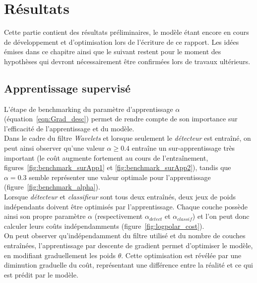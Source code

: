 
\chapter{Résultats} %
 
\label{Résultats} %


Cette partie contient des résultats préliminaires, le modèle étant encore en cours de développement et d'optimisation lors de l'écriture de ce rapport. Les idées émises dans ce chapitre ainsi que le suivant restent pour le moment des hypothèses qui devront nécessairement être confirmées lors de travaux ultérieurs. \\

\section{Apprentissage supervisé}

L'étape de benchmarking du paramètre d'apprentissage $\alpha$ (équation~\ref{eqn:Grad_desc}) permet de rendre compte de son importance sur l'efficacité de l'apprentissage et du modèle. \\
Dans le cadre du filtre \textit{Wavelets} et lorsque seulement le \textit{détecteur} est entraîné, on peut ainsi observer qu'une valeur $\alpha\geq0.4$ entraîne un sur-apprentissage très important (le coût augmente fortement au cours de l'entraînement, figures~\ref{fig:benchmark_surApp1} et \ref{fig:benchmark_surApp2}), tandis que $\alpha=0.3$ semble représenter une valeur optimale pour l'apprentissage (figure~\ref{fig:benchmark_alpha}).\\
Lorsque \textit{détecteur} et \textit{classifieur} sont tous deux entraînés, deux jeux de poids indépendants doivent être optimisés par l'apprentissage. Chaque couche possède ainsi son propre paramètre $\alpha$ (respectivement $\alpha_{detect}$ et $\alpha_{classif}$) et l'on peut donc calculer leurs coûts indépendamments (figure~\ref{fig:logpolar_cost}).\\
On peut observer qu'indépendamment du filtre utilisé et du nombre de couches entraînées, l'apprentissage par descente de gradient permet d'optimiser le modèle, en modifiant graduellement les poids $\theta$. Cette optimisation est révélée par une diminution graduelle du coût, représentant une différence entre la réalité et ce qui est prédit par le modèle.

